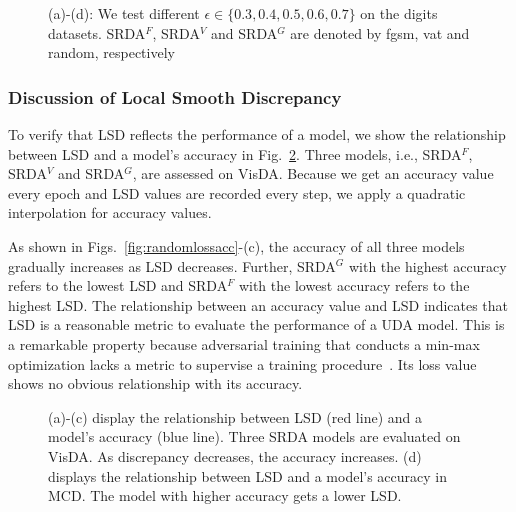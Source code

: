 \documentclass[journal,twocolumn]{IEEEtran}
\theoremstyle{definition}
\begin{document}
\begin{figure}
  \centering
\caption{(a)-(d): We test different $\epsilon\in\{0.3, 0.4, 0.5, 0.6, 0.7\}$ on the digits datasets. SRDA$^F$, SRDA$^V$ and SRDA$^G$ are denoted by fgsm, vat and random, respectively}
  \label{fig:sensitivity} \end{figure}

\subsubsection{Discussion of Local Smooth Discrepancy}

To verify that LSD reflects the performance of a model, we show the relationship between LSD and a model's accuracy in Fig.~\ref{fig:lossacc}. Three models, i.e., SRDA$^F$, SRDA$^V$ and SRDA$^G$, are assessed on VisDA. Because we get an accuracy value every epoch and LSD values are recorded every step,
we apply a quadratic interpolation for accuracy values.

As shown in Figs.~\ref{fig:randomlossacc}-(c), the accuracy of all three models gradually increases as LSD decreases. Further, SRDA$^G$ with the highest accuracy refers to the lowest LSD and SRDA$^F$ with the lowest accuracy refers to the highest LSD. The relationship between an accuracy value and LSD indicates that LSD is a reasonable metric to evaluate the performance of a UDA model. This is a remarkable property because adversarial training that conducts a min-max optimization lacks a metric to supervise a training procedure~\cite{ganin2016domain}. Its loss value shows no obvious relationship with its accuracy. 
\begin{figure}[h]
  \centering
\caption{(a)-(c) display the relationship between LSD (red line) and a model's accuracy (blue line). Three SRDA models are evaluated on VisDA. As discrepancy decreases, the accuracy increases. (d) displays the relationship between LSD and a model's accuracy in MCD. The model with higher accuracy gets a lower LSD.}
  \label{fig:lossacc} \end{figure} 
\end{document}
